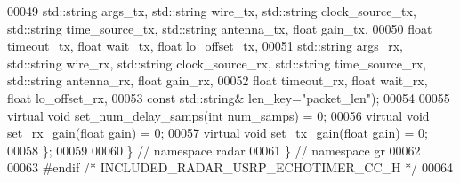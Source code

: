 \begin{DoxyCode}
00049         std::string args\_tx, std::string wire\_tx, std::string clock\_source\_tx, 
      std::string time\_source\_tx, std::string antenna\_tx, \textcolor{keywordtype}{float} gain\_tx,
00050         \textcolor{keywordtype}{float} timeout\_tx, \textcolor{keywordtype}{float} wait\_tx, \textcolor{keywordtype}{float} lo\_offset\_tx,
00051         std::string args\_rx, std::string wire\_rx, std::string clock\_source\_rx, 
      std::string time\_source\_rx, std::string antenna\_rx, \textcolor{keywordtype}{float} gain\_rx,
00052         \textcolor{keywordtype}{float} timeout\_rx, \textcolor{keywordtype}{float} wait\_rx, \textcolor{keywordtype}{float} lo\_offset\_rx,
00053         \textcolor{keyword}{const} std::string& len\_key=\textcolor{stringliteral}{"packet\_len"});
00054         
00055       \textcolor{keyword}{virtual} \textcolor{keywordtype}{void} set\_num\_delay\_samps(\textcolor{keywordtype}{int} num\_samps) = 0;
00056       \textcolor{keyword}{virtual} \textcolor{keywordtype}{void} set\_rx\_gain(\textcolor{keywordtype}{float} gain) = 0;
00057       \textcolor{keyword}{virtual} \textcolor{keywordtype}{void} set\_tx\_gain(\textcolor{keywordtype}{float} gain) = 0;
00058     \};
00059 
00060   \} \textcolor{comment}{// namespace radar}
00061 \} \textcolor{comment}{// namespace gr}
00062 
00063 \textcolor{preprocessor}{#endif }\textcolor{comment}{/* INCLUDED\_RADAR\_USRP\_ECHOTIMER\_CC\_H */}\textcolor{preprocessor}{}
00064 
\end{DoxyCode}
